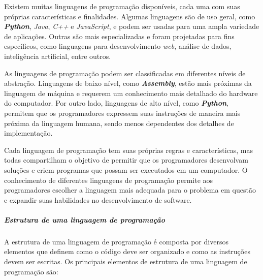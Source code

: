 \documentclass[a4paper, 12pt, onecolumn,singlespacing]{article}
\begin{document}
	Existem muitas linguagens de programação disponíveis, cada uma com suas próprias características e finalidades. Algumas linguagens são de uso geral, como \textbf{\textit{Python}}, \textit{Java}, \textit{C++} e \textit{JavaScript}, e podem ser usadas para uma ampla variedade de aplicações. Outras são mais especializadas e foram projetadas para fins específicos, como linguagens para desenvolvimento \textit{web}, análise de dados, inteligência artificial, entre outros.
	
	As linguagens de programação podem ser classificadas em diferentes níveis de abstração. Linguagens de baixo nível, como \textit{\textbf{Assembly}}, estão mais próximas da linguagem de máquina e requerem um conhecimento mais detalhado do hardware do computador. Por outro lado, linguagens de alto nível, como \textbf{\textit{Python}}, permitem que os programadores expressem suas instruções de maneira mais próxima da linguagem humana, sendo menos dependentes dos detalhes de implementação.
	
	Cada linguagem de programação tem suas próprias regras e características, mas todas compartilham o objetivo de permitir que os programadores desenvolvam soluções e criem programas que possam ser executados em um computador. O conhecimento de diferentes linguagens de programação permite aos programadores escolher a linguagem mais adequada para o problema em questão e expandir suas habilidades no desenvolvimento de software.
	
	\subparagraph{Estrutura de uma linguagem de programação} \label{estrutura_da_linguagem_de_programacao} A estrutura de uma linguagem de programação é composta por diversos elementos que definem como o código deve ser organizado e como as instruções devem ser escritas. Os principais elementos de estrutura de uma linguagem de programação são:
	
\end{document}
